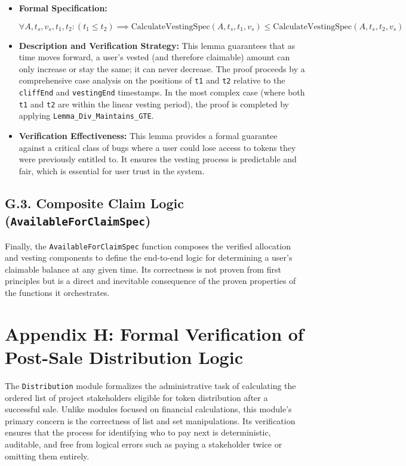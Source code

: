 \documentclass[
  english,
  onecolumn]{article}
\begin{document}
\begin{itemize}
\item
  \textbf{Formal Specification:}

  \(\forall A, t_s, v_s, t_1, t_2 : (t_1 \le t_2) \implies \text{CalculateVestingSpec}(A, t_s, t_1, v_s) \le \text{CalculateVestingSpec}(A, t_s, t_2, v_s)\)
\item
  \textbf{Description and Verification Strategy:} This lemma guarantees
  that as time moves forward, a user's vested (and therefore claimable)
  amount can only increase or stay the same; it can never decrease. The
  proof proceeds by a comprehensive case analysis on the positions of
  \texttt{t1} and \texttt{t2} relative to the \texttt{cliffEnd} and
  \texttt{vestingEnd} timestamps. In the most complex case (where both
  \texttt{t1} and \texttt{t2} are within the linear vesting period), the
  proof is completed by applying \texttt{Lemma\_Div\_Maintains\_GTE}.
\item
  \textbf{Verification Effectiveness:} This lemma provides a formal
  guarantee against a critical class of bugs where a user could lose
  access to tokens they were previously entitled to. It ensures the
  vesting process is predictable and fair, which is essential for user
  trust in the system.
\end{itemize}

\subsection{\texorpdfstring{G.3. Composite Claim Logic
(\texttt{AvailableForClaimSpec})}{G.3. Composite Claim Logic (AvailableForClaimSpec)}}\label{g.3.-composite-claim-logic-availableforclaimspec}

Finally, the \texttt{AvailableForClaimSpec} function composes the
verified allocation and vesting components to define the end-to-end
logic for determining a user's claimable balance at any given time. Its
correctness is not proven from first principles but is a direct and
inevitable consequence of the proven properties of the functions it
orchestrates.

\section{Appendix H: Formal Verification of Post-Sale Distribution
Logic}\label{appendix-h-formal-verification-of-post-sale-distribution-logic}

The \texttt{Distribution} module formalizes the administrative task of
calculating the ordered list of project stakeholders eligible for token
distribution after a successful sale. Unlike modules focused on
financial calculations, this module's primary concern is the correctness
of list and set manipulations. Its verification ensures that the process
for identifying who to pay next is deterministic, auditable, and free
from logical errors such as paying a stakeholder twice or omitting them
entirely.
\end{document}
